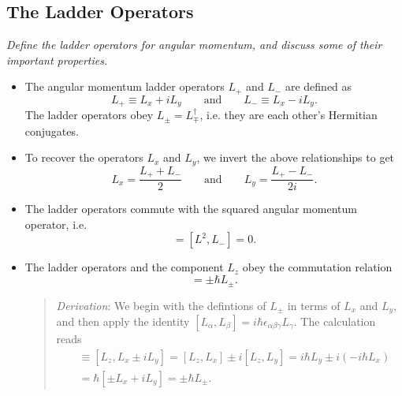 \documentclass[11pt, a4paper]{article}
\newcommand{\eqtext}[1]{\qquad \text{#1} \qquad}
\newcommand{\Herm}{Hermitian\xspace}
\begin{document}
\subsection{The Ladder Operators}
\textit{Define the ladder operators for angular momentum, and discuss some of their important properties.}
\begin{itemize}
	\item The angular momentum ladder operators $ L_{+} $ and $ L_{-} $ are defined as
	\begin{equation*}
		L_{+} \equiv L_{x} + iL_{y} \eqtext{and} L_{-} \equiv L_{x} - i L_{y}.
	\end{equation*}
    The ladder operators obey $ L_{\pm} = L_{\mp}^{\dagger} $, i.e. they are each other's \Herm conjugates.
    
    \item To recover the operators $ L_{x} $ and $ L_{y} $, we invert the above relationships to get
    \begin{equation*}
        L_{x} = \frac{L_{+} + L_{-}}{2} \qquad \text{and} \qquad L_{y} = \frac{L_{+} - L_{-}}{2i}.
    \end{equation*}
    
	\item The ladder operators commute with the squared angular momentum operator, i.e.
	\begin{equation*}
		[L^{2}, L_{+}] = [L^{2}, L_{-}] = 0.
	\end{equation*}
	
	
    \item The ladder operators and the component $ L_{z} $ obey the commutation relation
    \begin{equation*}
        [L_{z}, L_{\pm}] = \pm \hbar L_{\pm}.
    \end{equation*}
    \begin{quote}
        \textit{Derivation}: We begin with the defintions of $ L_{\pm} $ in terms of $ L_{x} $ and $ L_{y} $, and then apply the identity $ [L_{\alpha}, L_{\beta}] = i \hbar \epsilon_{\alpha \beta \gamma} L_{\gamma} $. The calculation reads
        \begin{align*}
            [L_{z}, L_{\pm}] &\equiv [L_{z}, L_{x} \pm i L_{y}] = [L_{z}, L_{x}] \pm i [L_{z}, L_{y}] = i \hbar L_{y} \pm i(-i \hbar L_{x})\\
            & = \hbar [\pm L_{x} + iL_{y}] = \pm \hbar L_{\pm}.
        \end{align*}
    \end{quote} 
	

\end{itemize}
\end{document}
